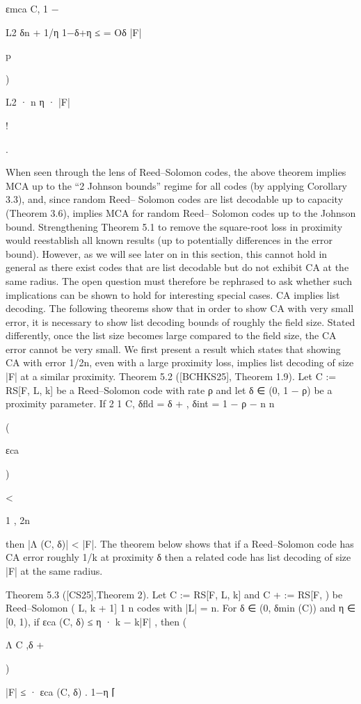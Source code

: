 \documentclass[11pt]{article}
\begin{document}
εmca C, 1 −

L2 δn + 1/η
1−δ+η ≤
= Oδ
|F|

p

)

L2 · n
η · |F|

!

.

When seen through the lens of Reed–Solomon codes, the above theorem implies MCA up to
the “2 Johnson bounds” regime for all codes (by applying Corollary 3.3), and, since random Reed–
Solomon codes are list decodable up to capacity (Theorem 3.6), implies MCA for random Reed–
Solomon codes up to the Johnson bound.
Strengthening Theorem 5.1 to remove the square-root loss in proximity would reestablish all
known results (up to potentially differences in the error bound). However, as we will see later on
in this section, this cannot hold in general as there exist codes that are list decodable but do not
exhibit CA at the same radius. The open question must therefore be rephrased to ask whether
such implications can be shown to hold for interesting special cases.
CA implies list decoding. The following theorems show that in order to show CA with very
small error, it is necessary to show list decoding bounds of roughly the field size. Stated differently,
once the list size becomes large compared to the field size, the CA error cannot be very small.
We first present a result which states that showing CA with error 1/2n, even with a large
proximity loss, implies list decoding of size |F| at a similar proximity.
Theorem 5.2 ([BCHKS25], Theorem 1.9). Let C := RS[F, L, k] be a Reed–Solomon code with rate
ρ and let δ ∈ (0, 1 − ρ) be a proximity parameter. If
2
1
C, δfld = δ + , δint = 1 − ρ −
n
n

(

εca

)

<

1
,
2n

then |Λ (C, δ)| < |F|.
The theorem below shows that if a Reed–Solomon code has CA error roughly 1/k at proximity
δ then a related code has list decoding of size |F| at the same radius.

Theorem 5.3 ([CS25],Theorem 2). Let C := RS[F, L, k] and C + := RS[F,
) be Reed–Solomon
( L, k + 1]
1
n
codes with |L| = n. For δ ∈ (0, δmin (C)) and η ∈ [0, 1), if εca (C, δ) ≤ η · k − k|F| , then
(

Λ C ,δ
+

)

|F|
≤
· εca (C, δ) .
1−η
⌈
\end{document}
